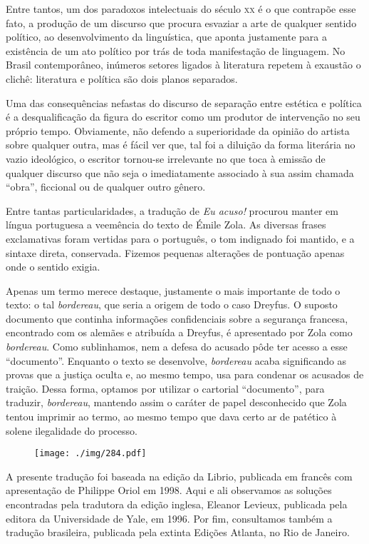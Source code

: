 Entre tantos, um dos paradoxos intelectuais do século \textsc{xx} é o que
contrapõe esse fato, a produção de um discurso que procura esvaziar a
arte de qualquer sentido político, ao desenvolvimento da linguística,
que aponta justamente para a existência de um ato político por trás de
toda manifestação de linguagem. No Brasil contemporâneo, inúmeros
setores ligados à literatura repetem à exaustão o clichê: literatura e
política são dois planos separados. 

Uma das consequências nefastas do discurso de separação entre estética
e política é a desqualificação da figura do escritor como um produtor
de intervenção no seu próprio tempo. Obviamente, não defendo a
superioridade da opinião do artista sobre qualquer outra, mas é fácil
ver que, tal foi a diluição da forma literária no vazio ideológico, o
escritor tornou-se irrelevante no que toca à emissão de qualquer
discurso que não seja o imediatamente associado à sua assim chamada
“obra”, ficcional ou de qualquer outro gênero.
\asterisc

 Entre tantas particularidades, a tradução de \textit{Eu acuso!} procurou
manter em língua portuguesa a veemência do texto de Émile Zola. As
diversas frases exclamativas foram vertidas para o português, o tom 
indignado foi mantido, e a sintaxe direta, conservada. Fizemos pequenas
alterações de pontuação apenas onde o sentido exigia. 

Apenas um termo merece destaque, justamente o mais importante de todo o
texto: o tal \textit{bordereau}, que seria a origem de todo o caso Dreyfus. O
suposto documento que continha informações confidenciais sobre a segurança
francesa, encontrado com os alemães e atribuída a Dreyfus, é
apresentado por Zola como \textit{bordereau}. Como sublinhamos, nem a defesa
do acusado pôde ter acesso a esse “documento”. Enquanto o texto se
desenvolve, \textit{bordereau} acaba significando as provas que a justiça
oculta e, ao mesmo tempo, usa para condenar os acusados de traição.
Dessa forma, optamos por utilizar o cartorial “documento”, para
traduzir, \textit{bordereau}, mantendo assim o caráter de papel desconhecido
que Zola tentou imprimir ao termo, ao mesmo tempo que dava certo ar de
patético à solene ilegalidade do processo. 

\begin{figure}
\centering
\texttt{[image: ./img/284.pdf]}
\end{figure}

 A presente tradução foi baseada na edição da Librio, publicada em
francês com apresentação de Philippe Oriol em 1998. Aqui e ali observamos
as soluções encontradas pela tradutora da edição inglesa, Eleanor
Levieux, publicada pela editora da Universidade de Yale, em 1996. Por
fim, consultamos também a tradução brasileira, publicada pela extinta
Edições Atlanta, no Rio de Janeiro. 

